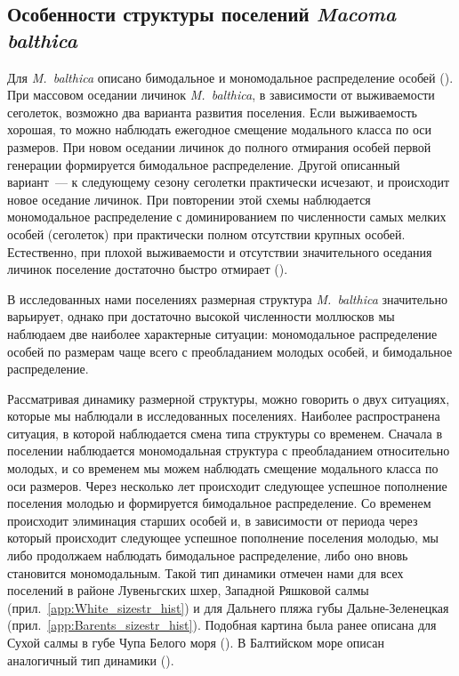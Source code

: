 	\subsection{Особенности структуры поселений {\it Macoma balthica}}
Для \textit{M.~balthica} описано бимодальное и мономодальное распределение особей (\cite{Segerstrale_1969, Maximovich_et_al_1991, Nikolaeva_1997, Nikolaeva_1998}). 
При массовом оседании личинок  \textit{M.~balthica}, в зависимости от выживаемости сеголеток, возможно два варианта развития поселения. 
Если выживаемость хорошая, то можно наблюдать ежегодное смещение модального класса по оси размеров. 
При новом оседании личинок до полного отмирания особей первой генерации формируется бимодальное распределение. 
Другой описанный вариант~--- к следующему сезону сеголетки практически исчезают, и происходит новое оседание личинок. 
При повторении этой схемы наблюдается мономодальное распределение с доминированием по численности самых мелких особей (сеголеток) при практически полном отсутствии крупных особей. Естественно, при плохой выживаемости и отсутствии значительного оседания личинок поселение достаточно быстро отмирает (\cite{Maximovich_et_al_1991}).

В исследованных нами поселениях размерная структура \textit{M.~balthica} значительно варьирует, однако при достаточно высокой численности моллюсков мы наблюдаем две наиболее характерные ситуации: мономодальное распределение особей по размерам чаще всего с преобладанием молодых особей, и бимодальное распределение.

Рассматривая динамику размерной структуры, можно говорить о  двух ситуациях, которые мы наблюдали в исследованных поселениях.
Наиболее распространена ситуация, в которой наблюдается смена типа структуры со временем. 
Сначала в поселении наблюдается мономодальная структура с преобладанием относительно молодых, и со временем мы можем наблюдать смещение модального класса по оси размеров. 
Через несколько лет происходит следующее успешное пополнение поселения молодью и формируется бимодальное распределение.
Со временем происходит элиминация старших особей и, в зависимости от периода через который происходит следующее успешное пополнение поселения молодью, мы либо продолжаем наблюдать бимодальное распределение, либо оно вновь становится мономодальным.
Такой тип динамики отмечен нами для всех поселений в районе Лувеньгских шхер, Западной Ряшковой салмы (прил.~\ref{app:White_sizestr_hist}) и для Дальнего пляжа губы Дальне-Зеленецкая (прил.~\ref{app:Barents_sizestr_hist}).
Подобная картина была ранее описана для Сухой салмы в губе Чупа Белого моря (\cite{Maximovich_et_al_1991}).
В Балтийском море описан аналогичный тип динамики (\cite{Segerstrale_1969}).

